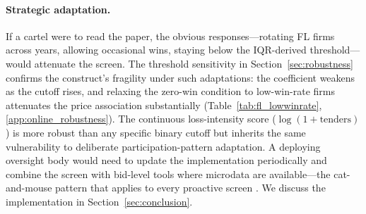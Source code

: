 

\paragraph{Strategic adaptation.}
If a cartel were to read the paper, the obvious responses---rotating
FL firms across years, allowing occasional wins, staying
below the IQR-derived threshold---would attenuate the screen.
The threshold sensitivity in
Section~\ref{sec:robustness} confirms the construct's
fragility under such adaptations: the coefficient weakens as
the cutoff rises, and relaxing the zero-win condition to
low-win-rate firms attenuates the price association
substantially
(Table~\ref{tab:fl_lowwinrate}, \ref{app:online_robustness}).
The continuous loss-intensity score
($\log(1 + \text{tenders})$) is more robust than any specific
binary cutoff but inherits the same vulnerability to deliberate
participation-pattern adaptation. A deploying oversight body
would need to update the implementation periodically and
combine the screen with bid-level tools where microdata are
available---the cat-and-mouse pattern that applies to every
proactive screen \citep{harrington2008detecting}. We discuss
the implementation in Section~\ref{sec:conclusion}.


